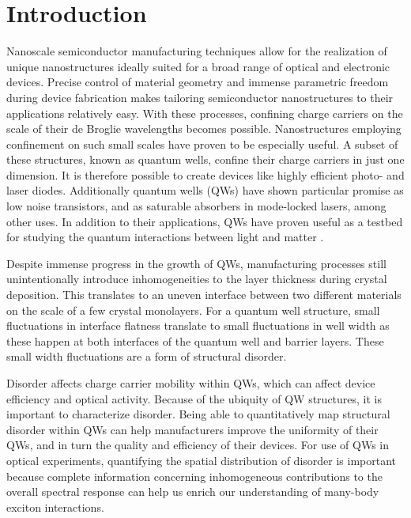 \chapter{Introduction}



\indent Nanoscale semiconductor manufacturing techniques allow for the realization of unique nanostructures ideally suited for a broad range of optical and electronic devices. Precise control of material geometry and immense parametric freedom during device fabrication makes tailoring semiconductor nanostructures to their applications relatively easy. With these processes, confining charge carriers on the scale of their de Broglie wavelengths becomes possible. Nanostructures employing confinement on such small scales have proven to be especially useful. A subset of these structures, known as quantum wells, confine their charge carriers in just one dimension. It is therefore possible to create devices like highly efficient photo- and laser diodes. Additionally quantum wells (QWs) have shown particular promise as low noise transistors, and as saturable absorbers in mode-locked lasers, among other uses. In addition to their applications, QWs have proven useful as a testbed for studying the quantum interactions between light and matter \cite{stevereview, davies}.

\indent Despite immense progress in the growth of QWs, manufacturing processes still unintentionally introduce inhomogeneities to the layer thickness during crystal deposition. This translates to an uneven interface between two different materials on the scale of a few crystal monolayers. For a quantum well structure, small fluctuations in interface flatness translate to small fluctuations in well width as these happen at both interfaces of the quantum well and barrier layers. These small width fluctuations are a form of structural disorder.

\indent Disorder affects charge carrier mobility within QWs, which can affect device efficiency and optical activity. Because of the ubiquity of QW structures, it is important to characterize disorder. Being able to quantitatively map structural disorder within QWs can help manufacturers improve the uniformity of their QWs, and in turn the quality and efficiency of their devices. For use of QWs in optical experiments, quantifying the spatial distribution of disorder is important because complete information concerning inhomogeneous contributions to the overall spectral response can help us enrich our understanding of many-body exciton interactions.

